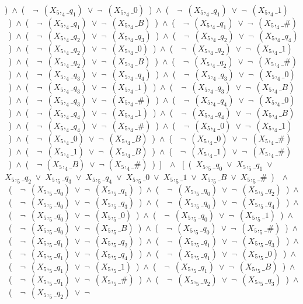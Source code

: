 ﻿\documentclass[a4paper,10pt]{article}
\begin{document}
)\ $\wedge$\ (\ \ $\neg$\ $(X_5,_4\_q_1)$\ $\vee$\ $\neg$\ $(X_5,_4\_0)$\ )\ $\wedge$\ (\ \ $\neg$\ $(X_5,_4\_q_1)$\ $\vee$\ $\neg$\ $(X_5,_4\_1)$\ )\ $\wedge$\ (\ \ $\neg$\ $(X_5,_4\_q_1)$\ $\vee$\ $\neg$\ $(X_5,_4\_B)$\ )\ $\wedge$\ (\ \ $\neg$\ $(X_5,_4\_q_1)$\ $\vee$\ $\neg$\ $(X_5,_4\_\#)$\ )\ $\wedge$\ (\ \ $\neg$\ $(X_5,_4\_q_2)$\ $\vee$\ $\neg$\ $(X_5,_4\_q_3)$\ )\ $\wedge$\ (\ \ $\neg$\ $(X_5,_4\_q_2)$\ $\vee$\ $\neg$\ $(X_5,_4\_q_4)$\ )\ $\wedge$\ (\ \ $\neg$\ $(X_5,_4\_q_2)$\ $\vee$\ $\neg$\ $(X_5,_4\_0)$\ )\ $\wedge$\ (\ \ $\neg$\ $(X_5,_4\_q_2)$\ $\vee$\ $\neg$\ $(X_5,_4\_1)$\ )\ $\wedge$\ (\ \ $\neg$\ $(X_5,_4\_q_2)$\ $\vee$\ $\neg$\ $(X_5,_4\_B)$\ )\ $\wedge$\ (\ \ $\neg$\ $(X_5,_4\_q_2)$\ $\vee$\ $\neg$\ $(X_5,_4\_\#)$\ )\ $\wedge$\ (\ \ $\neg$\ $(X_5,_4\_q_3)$\ $\vee$\ $\neg$\ $(X_5,_4\_q_4)$\ )\ $\wedge$\ (\ \ $\neg$\ $(X_5,_4\_q_3)$\ $\vee$\ $\neg$\ $(X_5,_4\_0)$\ )\ $\wedge$\ (\ \ $\neg$\ $(X_5,_4\_q_3)$\ $\vee$\ $\neg$\ $(X_5,_4\_1)$\ )\ $\wedge$\ (\ \ $\neg$\ $(X_5,_4\_q_3)$\ $\vee$\ $\neg$\ $(X_5,_4\_B)$\ )\ $\wedge$\ (\ \ $\neg$\ $(X_5,_4\_q_3)$\ $\vee$\ $\neg$\ $(X_5,_4\_\#)$\ )\ $\wedge$\ (\ \ $\neg$\ $(X_5,_4\_q_4)$\ $\vee$\ $\neg$\ $(X_5,_4\_0)$\ )\ $\wedge$\ (\ \ $\neg$\ $(X_5,_4\_q_4)$\ $\vee$\ $\neg$\ $(X_5,_4\_1)$\ )\ $\wedge$\ (\ \ $\neg$\ $(X_5,_4\_q_4)$\ $\vee$\ $\neg$\ $(X_5,_4\_B)$\ )\ $\wedge$\ (\ \ $\neg$\ $(X_5,_4\_q_4)$\ $\vee$\ $\neg$\ $(X_5,_4\_\#)$\ )\ $\wedge$\ (\ \ $\neg$\ $(X_5,_4\_0)$\ $\vee$\ $\neg$\ $(X_5,_4\_1)$\ )\ $\wedge$\ (\ \ $\neg$\ $(X_5,_4\_0)$\ $\vee$\ $\neg$\ $(X_5,_4\_B)$\ )\ $\wedge$\ (\ \ $\neg$\ $(X_5,_4\_0)$\ $\vee$\ $\neg$\ $(X_5,_4\_\#)$\ )\ $\wedge$\ (\ \ $\neg$\ $(X_5,_4\_1)$\ $\vee$\ $\neg$\ $(X_5,_4\_B)$\ )\ $\wedge$\ (\ \ $\neg$\ $(X_5,_4\_1)$\ $\vee$\ $\neg$\ $(X_5,_4\_\#)$\ )\ $\wedge$\ (\ \ $\neg$ $(X_5,_4\_B)$\ $\vee$\ $\neg$ $(X_5,_4\_\#)$\ )\ ]\ \ $\wedge$ \ [\ (\ $X_5,_5\_q_0$\ $\vee$\ $X_5,_5\_q_1$\ $\vee$\ $X_5,_5\_q_2$\ $\vee$\ $X_5,_5\_q_3$\ $\vee$\ $X_5,_5\_q_4$\ $\vee$\ $X_5,_5\_0$\ $\vee$\ $X_5,_5\_1$\ $\vee$\ $X_5,_5\_B$\ $\vee$\ $X_5,_5\_\#$\ )\ \ $\wedge$ \ (\ \ $\neg$\ $(X_5,_5\_q_0)$\ $\vee$\ $\neg$\ $(X_5,_5\_q_1)$\ )\ $\wedge$\ (\ \ $\neg$\ $(X_5,_5\_q_0)$\ $\vee$\ $\neg$\ $(X_5,_5\_q_2)$\ )\ $\wedge$\ (\ \ $\neg$\ $(X_5,_5\_q_0)$\ $\vee$\ $\neg$\ $(X_5,_5\_q_3)$\ )\ $\wedge$\ (\ \ $\neg$\ $(X_5,_5\_q_0)$\ $\vee$\ $\neg$\ $(X_5,_5\_q_4)$\ )\ $\wedge$\ (\ \ $\neg$\ $(X_5,_5\_q_0)$\ $\vee$\ $\neg$\ $(X_5,_5\_0)$\ )\ $\wedge$\ (\ \ $\neg$\ $(X_5,_5\_q_0)$\ $\vee$\ $\neg$\ $(X_5,_5\_1)$\ )\ $\wedge$\ (\ \ $\neg$\ $(X_5,_5\_q_0)$\ $\vee$\ $\neg$\ $(X_5,_5\_B)$\ )\ $\wedge$\ (\ \ $\neg$\ $(X_5,_5\_q_0)$\ $\vee$\ $\neg$\ $(X_5,_5\_\#)$\ )\ $\wedge$\ (\ \ $\neg$\ $(X_5,_5\_q_1)$\ $\vee$\ $\neg$\ $(X_5,_5\_q_2)$\ )\ $\wedge$\ (\ \ $\neg$\ $(X_5,_5\_q_1)$\ $\vee$\ $\neg$\ $(X_5,_5\_q_3)$\ )\ $\wedge$\ (\ \ $\neg$\ $(X_5,_5\_q_1)$\ $\vee$\ $\neg$\ $(X_5,_5\_q_4)$\ )\ $\wedge$\ (\ \ $\neg$\ $(X_5,_5\_q_1)$\ $\vee$\ $\neg$\ $(X_5,_5\_0)$\ )\ $\wedge$\ (\ \ $\neg$\ $(X_5,_5\_q_1)$\ $\vee$\ $\neg$\ $(X_5,_5\_1)$\ )\ $\wedge$\ (\ \ $\neg$\ $(X_5,_5\_q_1)$\ $\vee$\ $\neg$\ $(X_5,_5\_B)$\ )\ $\wedge$\ (\ \ $\neg$\ $(X_5,_5\_q_1)$\ $\vee$\ $\neg$\ $(X_5,_5\_\#)$\ )\ $\wedge$\ (\ \ $\neg$\ $(X_5,_5\_q_2)$\ $\vee$\ $\neg$\ $(X_5,_5\_q_3)$\ )\ $\wedge$\ (\ \ $\neg$\ $(X_5,_5\_q_2)$\ $\vee$\ $\neg$\ 
\end{document}
